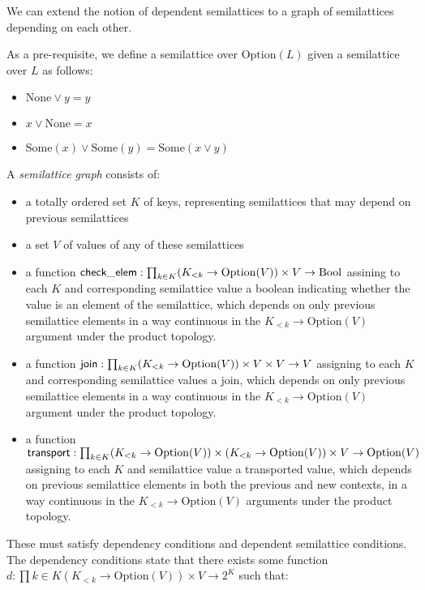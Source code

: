 \documentclass{article}
\begin{document}
      We can extend the notion of dependent semilattices to a graph of semilattices depending on each other.

      As a pre-requisite, we define a semilattice over $\mathrm{Option}(L)$ given a semilattice over $L$ as follows:

      \begin{itemize}
        \item $\mathrm{None} \vee y = y$
        \item $x \vee \mathrm{None} = x$
        \item $\mathrm{Some}(x) \vee \mathrm{Some}(y) = \mathrm{Some}(x \vee y)$
      \end{itemize}

      A \emph{semilattice graph} consists of:
      \begin{itemize}
        \item a totally ordered set $K$ of keys, representing semilattices that may depend on previous semilattices
        \item a set $V$ of values of any of these semilattices
        \item a function $\mathsf{check\_elem} : \prod_{k \in K} (K_{<k} \to \mathrm{Option}(V)) \times V \to \mathrm{Bool}$ assining to each $K$ and corresponding semilattice value a boolean indicating whether the value is an element of the semilattice, which depends on only previous semilattice elements in a way continuous in the $K_{<k} \to \mathrm{Option}(V)$ argument under the product topology.
        \item a function $\mathsf{join} : \prod_{k \in K} (K_{<k} \to \mathrm{Option}(V)) \times V \times V \to V$ assigning to each $K$ and corresponding semilattice values a join, which depends on only previous semilattice elements in a way continuous in the $K_{<k} \to \mathrm{Option}(V)$ argument under the product topology.
        \item a function $\mathsf{transport} : \prod_{k \in K} (K_{<k} \to \mathrm{Option}(V)) \times (K_{<k} \to \mathrm{Option}(V)) \times V \to \mathrm{Option}(V)$ assigning to each $K$ and semilattice value a transported value, which depends on previous semilattice elements in both the previous and new contexts, in a way continuous in the $K_{<k} \to \mathrm{Option}(V)$ arguments under the product topology.
      \end{itemize}

      These must satisfy dependency conditions and dependent semilattice conditions. The dependency conditions state that there exists some function $d : \prod{k \in K} (K_{<k} \to \mathrm{Option}(V)) \times V \rightarrow 2^K$ such that:
\end{document}
